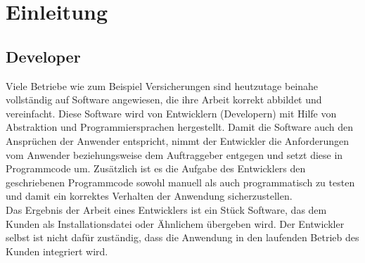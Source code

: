 \section{Einleitung}
\subsection{Developer}
Viele Betriebe wie zum Beispiel Versicherungen sind heutzutage beinahe vollständig auf Software angewiesen, die ihre Arbeit korrekt abbildet und vereinfacht. Diese Software wird von Entwicklern (Developern) mit Hilfe von Abstraktion und Programmiersprachen hergestellt. Damit die Software auch den Ansprüchen der Anwender entspricht, nimmt der Entwickler die Anforderungen vom Anwender beziehungsweise dem Auftraggeber entgegen und setzt diese in Programmcode um. Zusätzlich ist es die Aufgabe des Entwicklers den geschriebenen Programmcode sowohl manuell als auch programmatisch zu testen und damit ein korrektes Verhalten der Anwendung sicherzustellen.\\
Das Ergebnis der Arbeit eines Entwicklers ist ein Stück Software, das dem Kunden als Installationsdatei oder Ähnlichem übergeben wird. Der Entwickler selbst ist nicht dafür zuständig, dass die Anwendung in den laufenden Betrieb des Kunden integriert wird.

